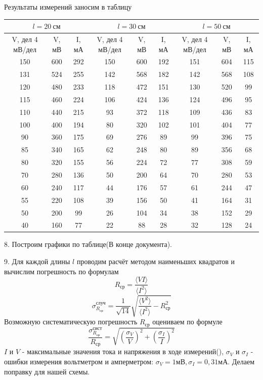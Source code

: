 \documentclass[a4paper, 12pt]{article}
\begin{document}
		Результаты измерений заносим в таблицу
		\begin{longtable}[H]{|c|c|c||c|c|c||c|c|c|}
			\hline
			\multicolumn{3}{|c||}{$l = 20\: см$} & \multicolumn{3}{c||}{$l = 30\: см$} & \multicolumn{3}{c|}{$l = 50\: см$}  \\
			\hline
			V, дел  4 мВ/дел & V, мВ & I, мА & V, дел  4 мВ/дел & V, мВ & I, мА & V, дел  4 мВ/дел & V, мВ & I, мА \\
			\hline
			150 & 600 & 292 & 150 & 600 & 192 & 151 & 604 & 115 \\
			\hline
			131 & 524 & 255 & 142 & 568 & 182 & 142 & 568 & 108 \\
			\hline
			120 & 480 & 233 & 118 & 472 & 151 & 130 & 520 & 99 \\
			\hline
			115 & 460 & 224 & 106 & 424 & 136 & 124 & 496 & 95 \\
			\hline
			110 & 440 & 215 & 93 & 372 & 118 & 109 & 436 & 83 \\
			\hline
			100 & 400 & 194 & 80 & 320 & 102 & 101 & 404 & 77 \\
			\hline
			90 & 360 & 175 & 69 & 276 & 89 & 99 & 396 & 75 \\
			\hline
			85 & 340 & 165 & 62 & 248 & 80 & 89 & 356 & 68 \\
			\hline
			80 & 320 & 155 & 56 & 224 & 72 & 77 & 308 & 59 \\
			\hline
			70 & 280 & 136 & 50 & 200 & 64 & 70 & 280 & 53 \\
			\hline
			60 & 240 & 117 & 44 & 176 & 57 & 61 & 244 & 47 \\
			\hline
			55 & 220 & 108 & 39 & 156 & 50 & 41 & 164 & 31 \\
			\hline
			50 & 200 & 99 & 26 & 104 & 34 & 38 & 152 & 29 \\
			\hline
			40 & 160 & 77 & 22 & 88 & 28 & 32 & 128 & 24 \\
			\hline
		\end{longtable}
		8. Построим графики по таблице(В конце документа).
		\par
		9. Для каждой длины $l$ проводим расчёт методом наименьших квадратов и вычислим погрешность по формулам
		$$ R_{ср} = \frac{\langle VI \rangle}{\langle I^2 \rangle}$$
		$$\sigma_{R_{ср}}^{случ} = \frac{1}{\sqrt{14}} \sqrt{\frac{\langle V^2 \rangle}{\langle I^2 \rangle} - R_{ср}^{2}} $$
		Возможную систематическую погрешность $R_{ср}$ оцениваем по формуле
		$$\frac{\sigma_{R_{ср}}^{сист}}{R_{ср}}=\sqrt{(\frac{\sigma_V}{V})^2+(\frac{\sigma_I}{I})^2}$$
		$I$ и $V$ - максимальные значения тока и напряжения в ходе измерений(), $\sigma_V$ и $\sigma_I$ - ошибки измерения вольтметром и амперметром: $\sigma_V = 1 мВ, \sigma_I = 0,31 мА$. Делаем поправку для нашей схемы.
\end{document}

